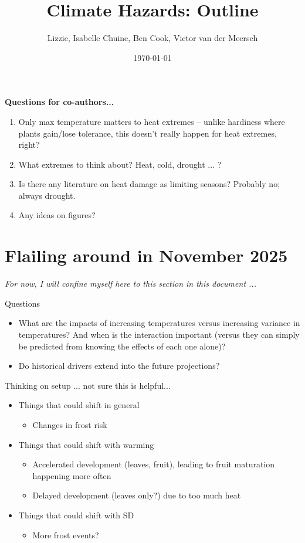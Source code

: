 \documentclass[11pt,letter]{article}
\begin{document}

\renewcommand{\refname}{\CHead{}}

\title{Climate Hazards: Outline} %
\author{Lizzie, Isabelle Chuine, Ben Cook, Victor van der Meersch} %
\date{\today}
\maketitle

{\bf Questions for co-authors...}
\begin{enumerate}
\item Only max temperature matters to heat extremes -- unlike hardiness where plants gain/lose tolerance, this doesn't really happen for heat extremes, right?
\item What extremes to think about? Heat, cold, drought ... ?
\item Is there any literature on heat damage as limiting seasons? Probably no; always drought. 
\item Any ideas on figures?
\end{enumerate}

\section{Flailing around in November 2025}
\emph{For now, I will confine myself here to this section in this document ...}

Questions
\begin{itemize}
\item What are the impacts of increasing temperatures versus increasing variance in temperatures? And when is the interaction important (versus they can simply be predicted from knowing the effects of each one alone)?
\item Do historical drivers extend into the future projections?
\end{itemize}

Thinking on setup ... not sure this is helpful... 
\begin{itemize}
\item  Things that could shift in general
\begin{itemize}
\item Changes in frost risk 
\end{itemize}
\item Things that could shift with warming
\begin{itemize}
\item Accelerated development (leaves, fruit), leading to fruit maturation happening more often
\item Delayed development (leaves only?) due to too much heat
\end{itemize}
\item Things that could shift with SD
\begin{itemize}
\item More frost events? 
\end{itemize}
\end{itemize}
\end{document}

